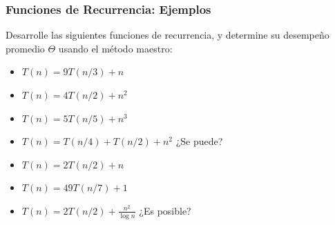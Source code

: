 \documentclass{beamer}
\begin{document}
\begin{frame}[fragile]
 \frametitle{Funciones de Recurrencia: Ejemplos}
\small
Desarrolle las siguientes funciones de recurrencia, y determine su desempeño promedio $\Theta$ usando el método maestro:
\begin{itemize}
\item $T(n) = 9T(n/3) + n$
\item $T(n) = 4T(n/2) + n^2 $
\item $T(n) = 5T(n/5) + n^3 $
\item $T(n) = T(n/4) + T(n/2) + n^2$ ¿Se puede?
\item $T(n) = 2T(n/2) + n$
\item $T(n) = 49T(n/7) + 1$ 
\item $T(n) = 2T(n/2) + \frac{n^2}{\log n}$ ¿Es posible?
\end{itemize}
\end{frame}
\end{document}
